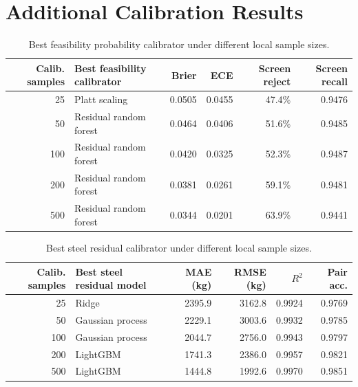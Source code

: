 \appendix
\section{Additional Calibration Results}
\label{app:calibration_results}
\setcounter{table}{0}
\renewcommand{\thetable}{A\arabic{table}}

\begin{table}[H]
\centering
\caption{Best feasibility probability calibrator under different local sample sizes.}
\label{tab:appendix_feasibility_calibrator}
\setlength{\tabcolsep}{5pt}
\begin{tabularx}{\textwidth}{@{}rXrrrr@{}}
\toprule
Calib. samples & Best feasibility calibrator & Brier & ECE & Screen reject & Screen recall \\
\midrule
25 & Platt scaling & 0.0505 & 0.0455 & 47.4\% & 0.9476 \\
50 & Residual random forest & 0.0464 & 0.0406 & 51.6\% & 0.9485 \\
100 & Residual random forest & 0.0420 & 0.0325 & 52.3\% & 0.9487 \\
200 & Residual random forest & 0.0381 & 0.0261 & 59.1\% & 0.9481 \\
500 & Residual random forest & 0.0344 & 0.0201 & 63.9\% & 0.9441 \\
\bottomrule
\end{tabularx}
\end{table}

\begin{table}[H]
\centering
\caption{Best steel residual calibrator under different local sample sizes.}
\label{tab:appendix_steel_calibrator}
\setlength{\tabcolsep}{5pt}
\begin{tabularx}{\textwidth}{@{}rXrrrr@{}}
\toprule
Calib. samples & Best steel residual model & MAE (kg) & RMSE (kg) & $R^2$ & Pair acc. \\
\midrule
25 & Ridge & 2395.9 & 3162.8 & 0.9924 & 0.9769 \\
50 & Gaussian process & 2229.1 & 3003.6 & 0.9932 & 0.9785 \\
100 & Gaussian process & 2044.7 & 2756.0 & 0.9943 & 0.9797 \\
200 & LightGBM & 1741.3 & 2386.0 & 0.9957 & 0.9821 \\
500 & LightGBM & 1444.8 & 1992.6 & 0.9970 & 0.9851 \\
\bottomrule
\end{tabularx}
\end{table}
